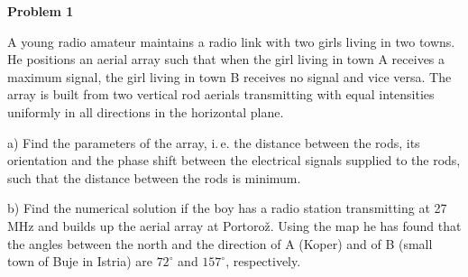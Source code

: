 \begin{center}\textbf{Problem 1}\end{center}

A young radio amateur maintains a radio link with two girls living in two towns. He positions an aerial array such that when the girl living in town A receives a maximum signal, the girl living in town B receives no signal and vice versa. The array is built from two vertical rod aerials transmitting with equal intensities uniformly in all directions in the horizontal plane.

a) Find the parameters of the array, i.\,e. the distance between the rods, its orientation and the phase shift between the electrical signals supplied to the rods, such that the distance between the rods is minimum.

b) Find the numerical solution if the boy has a radio station transmitting at 27\,MHz and builds up the aerial array at Portorož. Using the map he has found that the angles between the north and the direction of A (Koper) and of B (small town of Buje in Istria) are $72^\circ$ and $157^\circ$, respectively.

